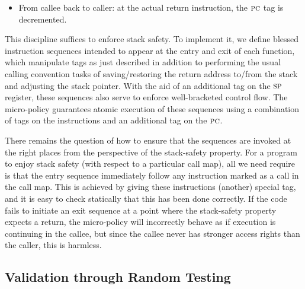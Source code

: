 \documentclass[acmsmall,review,anonymous]{acmart}\settopmatter{printfolios=true,printccs=false,printacmref=false}
\begin{document}
{\begin{itemize}
\item From callee back to caller: %
  at the actual return instruction,
  the $\textsc{pc}$ tag is decremented.

\end{itemize}

This discipline suffices to enforce stack safety.
To implement it,  we define blessed instruction sequences
intended to appear at the entry and exit of each function,
which manipulate tags as just described in addition to performing the
usual calling convention tasks of saving/restoring the return address to/from
the stack and adjusting the stack pointer. With the aid of an additional tag on
the $\textsc{sp}$ register, these sequences also serve to enforce
well-bracketed control flow.
The micro-policy guarantees atomic execution of these sequences
using a combination of tags on the instructions
and an additional tag on the $\textsc{pc}$.

There remains the question of how to ensure that the sequences are
invoked at the right places from the perspective of the stack-safety
property. For a program to enjoy stack safety
(with respect to a particular call map), all we need require is that
the entry sequence immediately follow  any instruction marked as a call
in the call map. This is achieved by giving these instructions (another) special tag,
and it is easy to check statically that this has been done correctly.
If the code fails to initiate an exit
sequence at a point where the stack-safety property expects a return,
the micro-policy will incorrectly behave as if execution
is continuing in the callee, but since the callee never has stronger access
rights than the caller, this is harmless.

\subsection{Validation through Random Testing}
\label{sec:testing}

}
\end{document}
